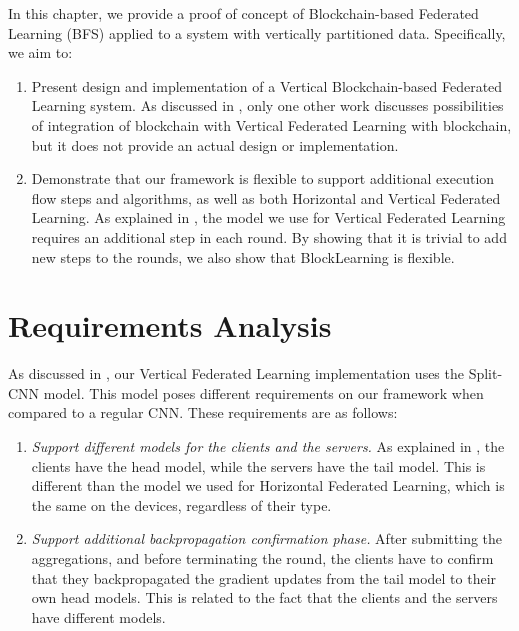 In this chapter, we provide a proof of concept of Blockchain-based Federated Learning (BFS) applied to a system with vertically partitioned data. Specifically, we aim to:

\begin{enumerate}
    \item Present design and implementation of a Vertical Blockchain-based Federated Learning system. As discussed in , only one other work \cite{10.48550/arxiv.1912.04859} discusses possibilities of integration of blockchain with Vertical Federated Learning with blockchain, but it does not provide an actual design or implementation.
    
    \item Demonstrate that our framework is flexible to support additional execution flow steps and algorithms, as well as both Horizontal and Vertical Federated Learning. As explained in , the model we use for Vertical Federated Learning requires an additional step in each round. By showing that it is trivial to add new steps to the rounds, we also show that BlockLearning is flexible.
\end{enumerate}

\section{Requirements Analysis}

As discussed in , our Vertical Federated Learning implementation uses the Split-CNN model. This model poses different requirements on our framework when compared to a regular CNN. These requirements are as follows:

\begin{enumerate}
    \item \textit{Support different models for the clients and the servers.} As explained in , the clients have the head model, while the servers have the tail model. This is different than the model we used for Horizontal Federated Learning, which is the same on the devices, regardless of their type.
    
    \item \textit{Support additional backpropagation confirmation phase.} After submitting the aggregations, and before terminating the round, the clients have to confirm that they backpropagated the gradient updates from the tail model to their own head models. This is related to the fact that the clients and the servers have different models.
\end{enumerate}

